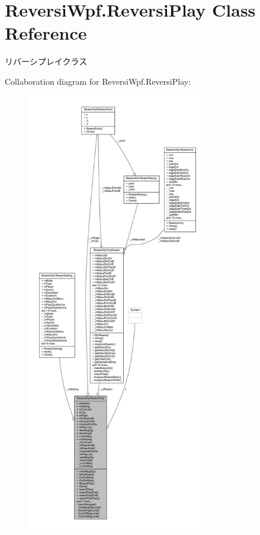 \hypertarget{class_reversi_wpf_1_1_reversi_play}{}\section{Reversi\+Wpf.\+Reversi\+Play Class Reference}
\label{class_reversi_wpf_1_1_reversi_play}


リバーシプレイクラス  




Collaboration diagram for Reversi\+Wpf.\+Reversi\+Play\+:\nopagebreak
\begin{figure}[H]
\begin{center}
\leavevmode
\includegraphics[height=550pt]{class_reversi_wpf_1_1_reversi_play__coll__graph}
\end{center}
\end{figure}
